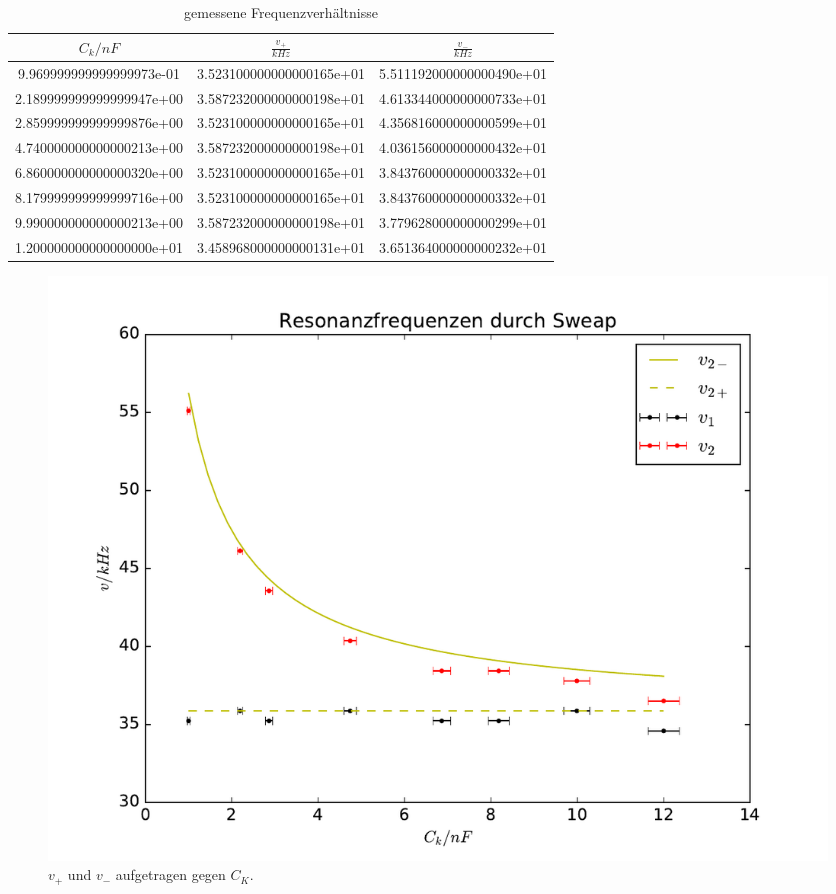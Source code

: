 \begin{table}
  \centering
\caption{gemessene Frequenzverhältnisse}
\label{tab:sweap}
\begin{tabular}{S S S}
  \toprule
  {$C_k/nF$} & {$\frac{v_+}{kHz}$} & {$\frac{v_-}{kHz}$}\\
  \midrule
  9.969999999999999973e-01 & 3.523100000000000165e+01 & 5.511192000000000490e+01\\
  2.189999999999999947e+00 & 3.587232000000000198e+01 & 4.613344000000000733e+01\\
  2.859999999999999876e+00 & 3.523100000000000165e+01 & 4.356816000000000599e+01\\
  4.740000000000000213e+00 & 3.587232000000000198e+01 & 4.036156000000000432e+01\\
  6.860000000000000320e+00 & 3.523100000000000165e+01 & 3.843760000000000332e+01\\
  8.179999999999999716e+00 & 3.523100000000000165e+01 & 3.843760000000000332e+01\\
  9.990000000000000213e+00 & 3.587232000000000198e+01 & 3.779628000000000299e+01\\
  1.200000000000000000e+01 & 3.458968000000000131e+01 & 3.651364000000000232e+01\\

\bottomrule
\end{tabular}
\end{table}
\FloatBarrier


\begin{figure}
  \centering
  \includegraphics[width=\textwidth]{./plots/sweap.pdf}
  \caption{$v_+$ und $v_-$ aufgetragen gegen $C_K$.}
  \label{fig:sweap}
\end{figure}
\FloatBarrier

